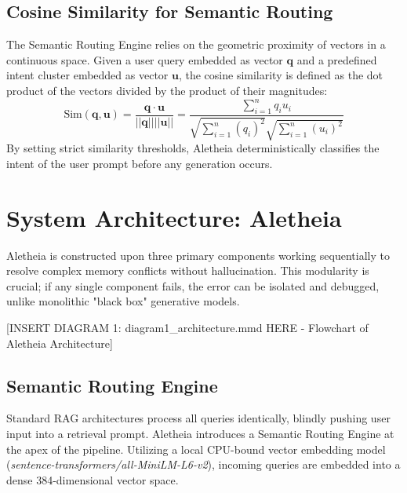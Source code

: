 \documentclass[journal,10pt]{IEEEtran}
\begin{document}
\subsection{Cosine Similarity for Semantic Routing}
The Semantic Routing Engine relies on the geometric proximity of vectors in a continuous space. Given a user query embedded as vector $\mathbf{q}$ and a predefined intent cluster embedded as vector $\mathbf{u}$, the cosine similarity is defined as the dot product of the vectors divided by the product of their magnitudes:
\begin{equation}
\text{Sim}(\mathbf{q}, \mathbf{u}) = \frac{\mathbf{q} \cdot \mathbf{u}}{||\mathbf{q}|| ||\mathbf{u}||} = \frac{\sum_{i=1}^{n} q_i u_i}{\sqrt{\sum_{i=1}^{n} (q_i)^2} \sqrt{\sum_{i=1}^{n} (u_i)^2}}
\end{equation}
By setting strict similarity thresholds, Aletheia deterministically classifies the intent of the user prompt before any generation occurs.


\section{System Architecture: Aletheia}
Aletheia is constructed upon three primary components working sequentially to resolve complex memory conflicts without hallucination. This modularity is crucial; if any single component fails, the error can be isolated and debugged, unlike monolithic "black box" generative models.

[INSERT DIAGRAM 1: diagram1\_architecture.mmd HERE - Flowchart of Aletheia Architecture]

\subsection{Semantic Routing Engine}
Standard RAG architectures process all queries identically, blindly pushing user input into a retrieval prompt. Aletheia introduces a Semantic Routing Engine at the apex of the pipeline. Utilizing a local CPU-bound vector embedding model (\textit{sentence-transformers/all-MiniLM-L6-v2}), incoming queries are embedded into a dense 384-dimensional vector space. 
\end{document}
